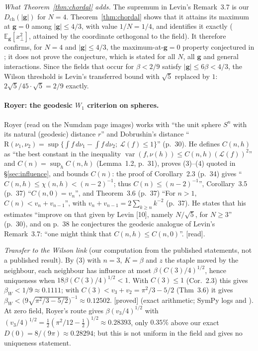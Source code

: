 \documentclass[11pt,a4paper]{article}
\theoremstyle{remark}
\theoremstyle{definition}
\newcommand{\E}{\mathbb{E}}
\newcommand{\st}[1]{\textsf{[#1]}}
\newcommand{\Dch}{D_{\mathrm{ch}}}
\begin{document}
\emph{What Theorem~\ref{thm:chordal} adds.} The supremum in Levin's Remark~3.7 is our $\Dch(|\mathbf g|)$ for $N=4$.
Theorem~\ref{thm:chordal} shows that it attains its maximum at $\mathbf g=0$ among $|\mathbf g|\le4/3$, with value
$1/N=1/4$, and identifies it exactly ($\E_{\mathbf g}[x_\perp^2]$, attained by the coordinate orthogonal to the
field). It therefore confirms, for $N=4$ and $|\mathbf g|\le4/3$, the maximum-at-$\mathbf g=0$ property conjectured
in \cite[Rem.~3.7]{Lev80}; it does not prove the conjecture, which is stated for all $N$, all $\mathbf g$ and general
interactions. Since the fields that occur for $\beta<2/9$ satisfy $|\mathbf g|\le6\beta<4/3$, the Wilson threshold is
Levin's transferred bound with $\sqrt5$ replaced by $1$: $2\sqrt5/45\cdot\sqrt5=2/9$ exactly.

\paragraph{Royer: the geodesic $W_1$ criterion on spheres.} Royer \cite{Roy86} (read on the Numdam page
images) works with ``the unit sphere $S^n$ with its natural (geodesic) distance $r$'' and Dobrushin's
distance ``$\mathrm R(\nu_1,\nu_2)=\sup\{\int f\,d\nu_1-\int f\,d\nu_2;\ \mathscr L(f)\leqslant1\}$'' (p.~30).
He defines $C(n,h)$ as ``the best constant in the inequality $\operatorname{var}(f,\nu(h))\leqslant C(n,h)(\mathscr L(f))^2$''
and $C(n)=\sup_hC(n,h)$ (Lemma~1.2, p.~31), proves (3)--(4) quoted in \S\ref{sec:influence}, and bounds $C(n)$:
the proof of Corollary~2.3 (p.~34) gives ``$C(n,h)\leqslant\chi(n,h)<(n-2)^{-1}$; thus
$C(n)\leqslant(n-2)^{-1}$'', Corollary~3.5 (p.~37) ``$C(n,0)=v_n$'', and Theorem~3.6 (p.~37) ``For $n>1$,
$C(n)<v_n+v_{n-1}$'', with $v_n+v_{n-1}=2\sum_{k\geqslant n}k^{-2}$ (p.~37). He states that his estimates
``improve on that given by Levin [10], namely $N/\sqrt5$, for $N\geqslant3$'' (p.~30), and on p.~38 he conjectures
the geodesic analogue of Levin's Remark~3.7: ``one might think that $C(n,h)\leqslant C(n,0)$''. \st{read}.

\emph{Transfer to the Wilson link} (our computation from the published statements, not a published
result). By (3) with $n=3$, $K=\beta$ and $z$ the staple moved by the neighbour, each neighbour has influence
at most $\beta(C(3)/4)^{1/2}$, hence uniqueness when $18\beta(C(3)/4)^{1/2}<1$. With $C(3)\le1$ (Cor.~2.3) this
gives $\beta_W<1/9\approx0.1111$; with $C(3)<v_3+v_2=\pi^2/3-5/2$ (Thm~3.6) it gives
$\beta_W<\big(9\sqrt{\pi^2/3-5/2}\big)^{-1}\approx0.12502$. \st{proved} (exact arithmetic; SymPy logs
 and ). At zero field, Royer's route gives $\beta(v_3/4)^{1/2}$ with
$(v_3/4)^{1/2}=\tfrac12(\pi^2/12-\tfrac12)^{1/2}\approx0.28393$, only $0.35\%$ above our exact
$D(0)=8/(9\pi)\approx0.28294$; but this is not uniform in the field and gives no uniqueness statement.
\end{document}
